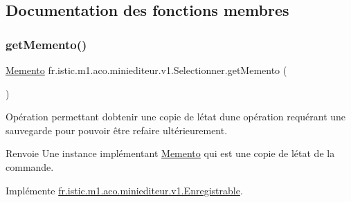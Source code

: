 \subsection{Documentation des fonctions membres}
\mbox{\label{classfr_1_1istic_1_1m1_1_1aco_1_1miniediteur_1_1v1_1_1Selectionner_a93bb9249ee51f501735f6b40d77dc3f3}} 
\subsubsection{\texorpdfstring{get\+Memento()}{getMemento()}}
{\footnotesize\ttfamily \hyperlink{interfacefr_1_1istic_1_1m1_1_1aco_1_1miniediteur_1_1v1_1_1Memento}{Memento} fr.\+istic.\+m1.\+aco.\+miniediteur.\+v1.\+Selectionner.\+get\+Memento (\begin{DoxyParamCaption}{ }\end{DoxyParamCaption})}



Opération permettant d\textquotesingle{}obtenir une copie de l\textquotesingle{}état d\textquotesingle{}une opération requérant une sauvegarde pour pouvoir être refaire ultérieurement. 

\begin{DoxyReturn}{Renvoie}
Une instance implémentant \hyperlink{interfacefr_1_1istic_1_1m1_1_1aco_1_1miniediteur_1_1v1_1_1Memento}{Memento} qui est une copie de l\textquotesingle{}état de la commande. 
\end{DoxyReturn}


Implémente \hyperlink{interfacefr_1_1istic_1_1m1_1_1aco_1_1miniediteur_1_1v1_1_1Enregistrable_aadf173c765d103d3924bbb688c45abb6}{fr.\+istic.\+m1.\+aco.\+miniediteur.\+v1.\+Enregistrable}.

\mbox{\label{classfr_1_1istic_1_1m1_1_1aco_1_1miniediteur_1_1v1_1_1Selectionner_a80d7d18546f239290919a9e602405ffd}} 

